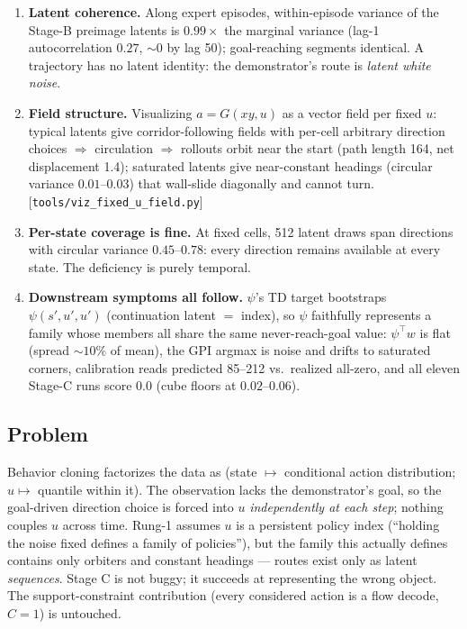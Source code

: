 \documentclass[11pt]{article}
\begin{document}
\begin{enumerate}
    \emph{Cube generalization (08-05, same tool):} 2 of 128 candidates succeed (both
    prior draws, each in 1 of 2 episodes --- ${\sim}1\%$ of (latent, episode) pairs);
    goal-transition preimages again do no better than random draws. The family's
    ${\sim}1$--$2\%$ ceiling \emph{quantitatively matches} the observed cube Stage-C GPI
    floor of $0.02$--$0.06$: GPI was already extracting everything the family contains.
    \emph{Antmaze (08-05):} 5 of 64 prior draws succeed, each in 1 of 2 episodes
    (${\sim}4\%$ of pairs). Family ceiling across the three envs: $0\%$ / ${\sim}1\%$ /
    ${\sim}4\%$ --- always floor-level, never usable.
  \item \textbf{Latent coherence.} Along expert episodes, within-episode variance of the
    Stage-B preimage latents is $0.99\times$ the marginal variance (lag-1 autocorrelation
    $0.27$, ${\sim}0$ by lag 50); goal-reaching segments identical. A trajectory has no
    latent identity: the demonstrator's route is \emph{latent white noise}.
  \item \textbf{Field structure.} Visualizing $a = G(xy, u)$ as a vector field per fixed
    $u$: typical latents give corridor-following fields with per-cell arbitrary direction
    choices $\Rightarrow$ circulation $\Rightarrow$ rollouts orbit near the start (path
    length 164, net displacement 1.4); saturated latents give near-constant headings
    (circular variance $0.01$--$0.03$) that wall-slide diagonally and cannot turn.
    [\texttt{tools/viz\_fixed\_u\_field.py}]
  \item \textbf{Per-state coverage is fine.} At fixed cells, 512 latent draws span
    directions with circular variance $0.45$--$0.78$: every direction remains available
    at every state. The deficiency is purely temporal.
  \item \textbf{Downstream symptoms all follow.} $\psi$'s TD target bootstraps
    $\psi(s', u', u')$ (continuation latent $=$ index), so $\psi$ faithfully represents
    a family whose members all share the same never-reach-goal value: $\psi^\top w$ is
    flat (spread ${\sim}10\%$ of mean), the GPI argmax is noise and drifts to saturated
    corners, calibration reads predicted 85--212 vs.\ realized all-zero, and all eleven
    Stage-C runs score $0.0$ (cube floors at $0.02$--$0.06$).
\end{enumerate}

\subsection*{Problem}
Behavior cloning factorizes the data as (state $\mapsto$ conditional action
distribution; $u \mapsto$ quantile within it). The observation lacks the demonstrator's
goal, so the goal-driven direction choice is forced into $u$ \emph{independently at each
step}; nothing couples $u$ across time. Rung-1 assumes $u$ is a persistent policy index
(``holding the noise fixed defines a family of policies''), but the family this actually
defines contains only orbiters and constant headings --- routes exist only as latent
\emph{sequences}. Stage C is not buggy; it succeeds at representing the wrong object.
The support-constraint contribution (every considered action is a flow decode, $C=1$)
is untouched.
\end{document}
